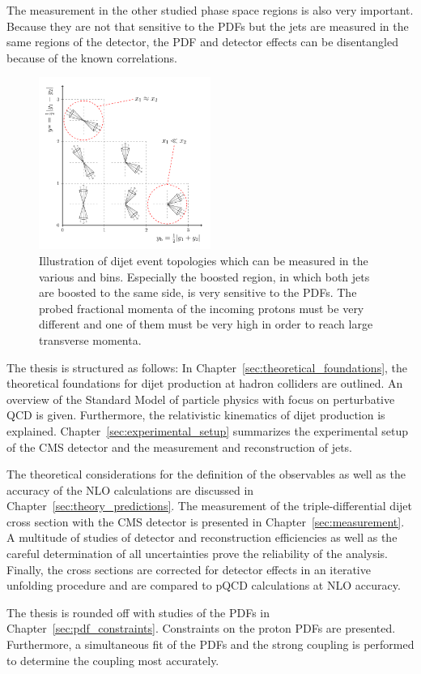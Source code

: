 The measurement in the other studied phase space regions is also very important.
Because they are not that sensitive to the PDFs but the jets are measured in the same
regions of the detector, the PDF and detector effects can be disentangled
because of the known correlations.

\begin{figure}
    \centering
    \caption[Illustration of dijet topologies various \ystar and \yboost bins]{
             Illustration of dijet event topologies which can be measured in
             the various \ystar and \yboost bins. Especially the boosted region,
             in which both jets are boosted to the same side, is very sensitive to the PDFs. 
             The probed fractional momenta of the incoming protons must be very
             different and one of them must be very high in order to reach large
             transverse momenta.}
    \label{fig:intro_ybys_hint}
    \includegraphics[width=0.5\textwidth]{figures/drawings/ybys_hint.pdf}
\end{figure}

The thesis is structured as follows: In
Chapter~\ref{sec:theoretical_foundations}, the theoretical foundations for dijet
production at hadron colliders are outlined. An overview of the Standard Model
of particle physics with focus on perturbative QCD is given.  Furthermore, the
relativistic kinematics of dijet production is explained.
Chapter~\ref{sec:experimental_setup} summarizes the experimental setup of the
CMS detector and the measurement and reconstruction of jets. 

The theoretical considerations for the definition of the observables as well as
the accuracy of the NLO calculations are discussed in
Chapter~\ref{sec:theory_predictions}. The measurement of the triple-differential
dijet cross section with the CMS detector is presented in
Chapter~\ref{sec:measurement}. A multitude of studies of detector and
reconstruction efficiencies as well as the careful determination of all
uncertainties prove the reliability of the analysis.  Finally, the cross
sections are corrected for detector effects in an iterative unfolding procedure
and are compared to pQCD calculations at NLO accuracy.

The thesis is rounded off with studies of the PDFs in
Chapter~\ref{sec:pdf_constraints}. Constraints on the proton PDFs are presented.
Furthermore, a simultaneous fit of the PDFs and the strong coupling is performed
to determine the coupling most accurately.

